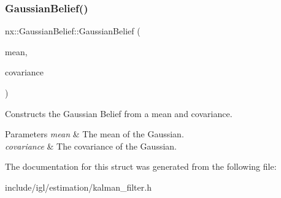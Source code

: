 \subsubsection{\texorpdfstring{Gaussian\+Belief()}{GaussianBelief()}}
{\footnotesize\ttfamily nx\+::\+Gaussian\+Belief\+::\+Gaussian\+Belief (\begin{DoxyParamCaption}\item[{const Vector\+Xd \&}]{mean,  }\item[{const Matrix\+Xd \&}]{covariance }\end{DoxyParamCaption})\hspace{0.3cm}{\ttfamily [inline]}}

Constructs the Gaussian Belief from a mean and covariance. 
\begin{DoxyParams}{Parameters}
{\em mean} & The mean of the Gaussian. \\
\hline
{\em covariance} & The covariance of the Gaussian. \\
\hline
\end{DoxyParams}


The documentation for this struct was generated from the following file\+:\begin{DoxyCompactItemize}
\item 
include/igl/estimation/kalman\+\_\+filter.\+h\end{DoxyCompactItemize}
